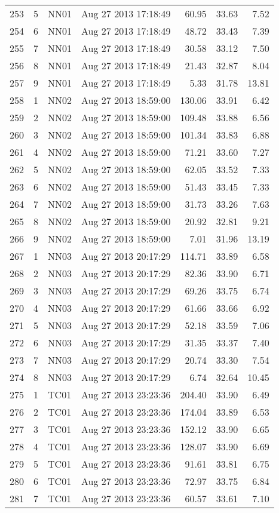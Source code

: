 \begin{longtable}{ccllrrr}
253&5&NN01&Aug 27 2013 17:18:49&60.95&33.63&7.52\\
254&6&NN01&Aug 27 2013 17:18:49&48.72&33.43&7.39\\
255&7&NN01&Aug 27 2013 17:18:49&30.58&33.12&7.50\\
256&8&NN01&Aug 27 2013 17:18:49&21.43&32.87&8.04\\
257&9&NN01&Aug 27 2013 17:18:49&5.33&31.78&13.81\\
\hline 
258&1&NN02&Aug 27 2013 18:59:00&130.06&33.91&6.42\\
259&2&NN02&Aug 27 2013 18:59:00&109.48&33.88&6.56\\
260&3&NN02&Aug 27 2013 18:59:00&101.34&33.83&6.88\\
261&4&NN02&Aug 27 2013 18:59:00&71.21&33.60&7.27\\
262&5&NN02&Aug 27 2013 18:59:00&62.05&33.52&7.33\\
263&6&NN02&Aug 27 2013 18:59:00&51.43&33.45&7.33\\
264&7&NN02&Aug 27 2013 18:59:00&31.73&33.26&7.63\\
265&8&NN02&Aug 27 2013 18:59:00&20.92&32.81&9.21\\
266&9&NN02&Aug 27 2013 18:59:00&7.01&31.96&13.19\\
\hline 
267&1&NN03&Aug 27 2013 20:17:29&114.71&33.89&6.58\\
268&2&NN03&Aug 27 2013 20:17:29&82.36&33.90&6.71\\
269&3&NN03&Aug 27 2013 20:17:29&69.26&33.75&6.74\\
270&4&NN03&Aug 27 2013 20:17:29&61.66&33.66&6.92\\
271&5&NN03&Aug 27 2013 20:17:29&52.18&33.59&7.06\\
272&6&NN03&Aug 27 2013 20:17:29&31.35&33.37&7.40\\
273&7&NN03&Aug 27 2013 20:17:29&20.74&33.30&7.54\\
274&8&NN03&Aug 27 2013 20:17:29&6.74&32.64&10.45\\
\hline 
275&1&TC01&Aug 27 2013 23:23:36&204.40&33.90&6.49\\
276&2&TC01&Aug 27 2013 23:23:36&174.04&33.89&6.53\\
277&3&TC01&Aug 27 2013 23:23:36&152.12&33.90&6.65\\
278&4&TC01&Aug 27 2013 23:23:36&128.07&33.90&6.69\\
279&5&TC01&Aug 27 2013 23:23:36&91.61&33.81&6.75\\
280&6&TC01&Aug 27 2013 23:23:36&72.97&33.75&6.84\\
281&7&TC01&Aug 27 2013 23:23:36&60.57&33.61&7.10\\

\end{longtable}
